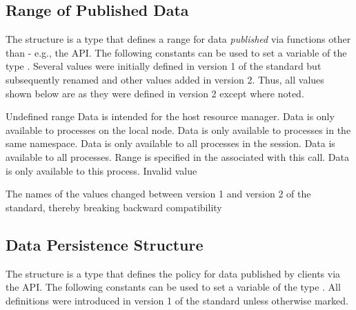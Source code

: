 \subsection{Range of Published Data}

The  structure is a  type that defines a range for data \textit{published} via functions other than  - e.g., the  \ac{API}.
The following constants can be used to set a variable of the type . Several values were initially defined in version 1 of the standard but subsequently renamed and other values added in version 2. Thus, all values shown below are as they were defined in version 2 except where noted.

\begin{constantdesc}
%
Undefined range
%
Data is intended for the host resource manager.
%
Data is only available to processes on the local node.
%
Data is only available to processes in the same namespace.
%
Data is only available to all processes in the session.
%
Data is available to all processes.
%
Range is specified in the  associated with this call.
%
Data is only available to this process.
%
Invalid value
%
\end{constantdesc}

\adviceuserstart
The names of the  values changed between version 1 and version 2 of the standard, thereby breaking backward compatibility
\adviceuserend

\subsection{Data Persistence Structure}

The  structure is a  type that defines the policy for data published by clients via the  \ac{API}.
The following constants can be used to set a variable of the type . All definitions were introduced in version 1 of the standard unless otherwise marked.


